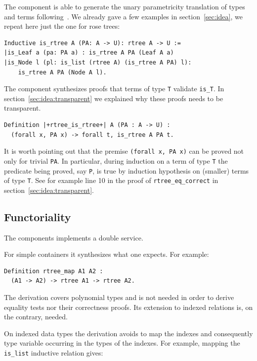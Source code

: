 \documentclass[sigplan,10pt,review]{acmart}\settopmatter{printfolios=true,printccs=false,printacmref=false}
\newcommand{\derive}[1]{\keys{#1}}
\begin{document}
The \derive{pram1} component is able to generate the unary
parametricity translation of types and terms
following~\cite{keller:hal-00730913}. We already gave a few
examples in section~\ref{sec:idea}, we repeat here just the
one for rose trees:

\begin{lstlisting}
Inductive is_rtree A (PA: A -> U): rtree A -> U :=
|is_Leaf a (pa: PA a) : is_rtree A PA (Leaf A a)
|is_Node l (pl: is_list (rtree A) (is_rtree A PA) l):
    is_rtree A PA (Node A l).
\end{lstlisting}

\noindent
The \derive{pram1P} component synthesizes proofs that terms
of type \lstinline+T+ validate \lstinline+is_T+.
In section~\ref{sec:idea:transparent} we explained why
these proofs needs to be transparent.

\begin{lstlisting}
Definition |+rtree_is_rtree+| A (PA : A -> U) :
  (forall x, PA x) -> forall t, is_rtree A PA t.
\end{lstlisting}

\noindent
It is worth pointing out that the premise
\lstinline+(forall x, PA x)+ can be proved not only for
trivial \lstinline+PA+. In particular, during induction
on a term of type \lstinline+T+ the predicate being
proved, say \lstinline+P+, is true by induction hypothesis
on (smaller) terms of type \lstinline+T+. See for example
line 10 in the proof of \lstinline+rtree_eq_correct+ in
section~\ref{sec:idea:transparent}.


\subsection{Functoriality} %

The \derive{map} components implements a double service.

For simple containers it synthesizes what one expects. For example:

\begin{lstlisting}
Definition rtree_map A1 A2 :
  (A1 -> A2) -> rtree A1 -> rtree A2.
\end{lstlisting}

The derivation covers polynomial types and is not needed in order
to derive equality tests nor their correctness proofs. Its extension
to indexed relations is, on the contrary, needed.

On indexed data types the derivation avoids to map the indexes and
consequently type variable occurring in the types of the indexes.
For example, mapping the \lstinline+is_list+ inductive relation gives:
\end{document}
